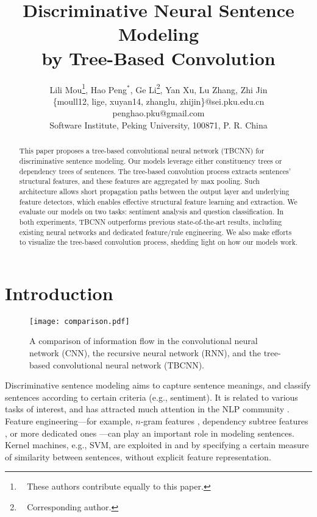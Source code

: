 \documentclass[11pt,a4paper]{article}
\title{Discriminative Neural Sentence Modeling\\
 by Tree-Based Convolution}
\author{Lili Mou\thanks{$\ \ \ \ $These authors contribute equally to this paper.},
Hao Peng$^{*}\!\!$,
Ge Li\thanks{$\ \ \ \ $Corresponding author.}, Yan Xu, Lu Zhang, Zhi Jin\\
\{moull12, lige, xuyan14, zhanglu, zhijin\}@sei.pku.edu.cn\\
penghao.pku@gmail.com\\
Software Institute, Peking University, 100871, P. R. China
}
\date{}
\begin{document}
\maketitle



\begin{abstract}
This paper proposes a tree-based convolutional neural network (TBCNN)
for discriminative sentence modeling.
Our models leverage either constituency trees or
dependency trees of sentences.
The tree-based convolution process extracts sentences' structural features, and
these features are aggregated by max pooling.
Such architecture allows short propagation paths between the output layer and 
underlying feature detectors, which enables
effective structural feature learning and extraction.
We evaluate our models on two tasks: sentiment analysis and question classification.
In both experiments, TBCNN outperforms previous state-of-the-art results,
including existing neural networks and dedicated feature/rule engineering.
We also make efforts to visualize the tree-based convolution process,
shedding light on how our models work.
\end{abstract}


\section{Introduction}
\begin{figure*}[!t]
\centering
\vspace{-.2cm}

\texttt{[image: comparison.pdf]}

\vspace{-.5cm}
\caption{A comparison of information flow in the convolutional neural network (CNN), the
recursive neural network (RNN), and the tree-based convolutional neural network (TBCNN).
}\label{fCompare}

\vspace{-.3cm}
\end{figure*}

Discriminative sentence modeling aims to capture sentence meanings,
and classify sentences according to certain criteria (e.g., sentiment).
It is related to various tasks of interest,
and has attracted much attention in the NLP community \cite{classify_sen,classify_sen_2,AdaCNN}.
Feature engineering---for example, $n$-gram features \cite{ngram}, 
dependency subtree features \cite{dependencyfeature}, or more dedicated ones \cite{QC}---can
play an important role in modeling sentences.
Kernel machines, e.g., SVM, are exploited in 
 and  by
specifying a certain measure of similarity between sentences, without
explicit feature representation.
\end{document}
